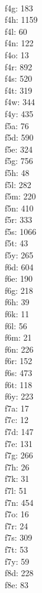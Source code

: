 \begin{multicols}{8}
  \\f4g: 183
  \\f4h: 1159
  \\f4l: 60
  \\f4n: 122
  \\f4o: 13
  \\f4r: 892
  \\f4s: 520
  \\f4t: 319
  \\f4w: 344
  \\f4y: 435
  \\f5a: 76
  \\f5d: 590
  \\f5e: 324
  \\f5g: 756
  \\f5h: 48
  \\f5l: 282
  \\f5m: 220
  \\f5n: 410
  \\f5r: 333
  \\f5s: 1066
  \\f5t: 43
  \\f5y: 265
  \\f6d: 604
  \\f6e: 190
  \\f6g: 218
  \\f6h: 39
  \\f6k: 11
  \\f6l: 56
  \\f6m: 21
  \\f6n: 226
  \\f6r: 152
  \\f6s: 473
  \\f6t: 118
  \\f6y: 223
  \\f7a: 17
  \\f7c: 12
  \\f7d: 147
  \\f7e: 131
  \\f7g: 266
  \\f7h: 26
  \\f7k: 31
  \\f7l: 51
  \\f7n: 454
  \\f7o: 16
  \\f7r: 24
  \\f7s: 309
  \\f7t: 53
  \\f7y: 59
  \\f8d: 228
  \\f8e: 83

\end{multicols}
